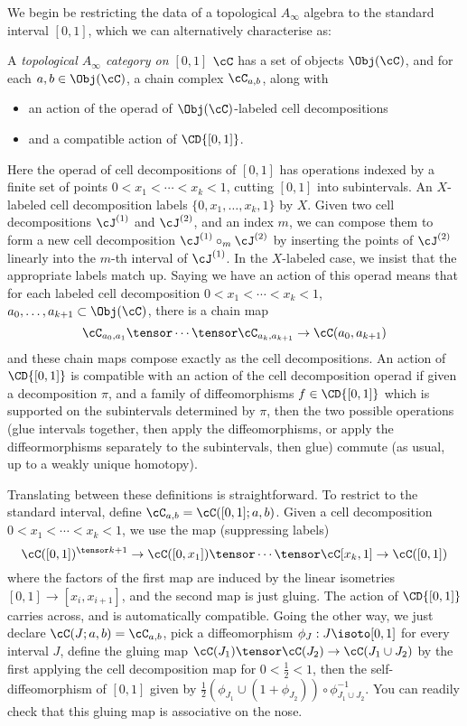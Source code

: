 \documentclass[11pt,leqno]{amsart}
\begin{document}
We begin be restricting the data of a topological $A_\infty$ algebra to the standard interval $[0,1]$, which we can alternatively characterise as:
\begin{defn}
A \emph{topological $A_\infty$ category on $[0,1]$} $\cC$ has a set of objects $\Obj(\cC)$, and for each $a,b \in \Obj(\cC)$, a chain complex $\cC_{a,b}$, along with
\begin{itemize}
\item an action of the operad of $\Obj(\cC)$-labeled cell decompositions
\item and a compatible action of $\CD{[0,1]}$.
\end{itemize}
\end{defn}
Here the operad of cell decompositions of $[0,1]$ has operations indexed by a finite set of points $0 < x_1< \cdots < x_k < 1$, cutting $[0,1]$ into subintervals. An $X$-labeled cell decomposition labels $\{0, x_1, \ldots, x_k, 1\}$ by $X$. Given two cell decompositions $\cJ^{(1)}$ and $\cJ^{(2)}$, and an index $m$, we can compose them to form a new cell decomposition $\cJ^{(1)} \circ_m \cJ^{(2)}$ by inserting the points of $\cJ^{(2)}$ linearly into the $m$-th interval of $\cJ^{(1)}$. In the $X$-labeled case, we insist that the appropriate labels match up. Saying we have an action of this operad means that for each labeled cell decomposition $0 < x_1< \cdots < x_k < 1$, $a_0, \ldots, a_{k+1} \subset \Obj(\cC)$, there is a chain map $$\cC_{a_0,a_1} \tensor \cdots \tensor \cC_{a_k,a_{k+1}} \to \cC(a_0,a_{k+1})$$ and these chain maps compose exactly as the cell decompositions.
An action of $\CD{[0,1]}$ is compatible with an action of the cell decomposition operad if given a decomposition $\pi$, and a family of diffeomorphisms $f \in \CD{[0,1]}$ which is supported on the subintervals determined by $\pi$, then the two possible operations (glue intervals together, then apply the diffeomorphisms, or apply the diffeormorphisms separately to the subintervals, then glue) commute (as usual, up to a weakly unique homotopy).

Translating between these definitions is straightforward. To restrict to the standard interval, define $\cC_{a,b} = \cC([0,1];a,b)$. Given a cell decomposition $0 < x_1< \cdots < x_k < 1$, we use the map (suppressing labels)
$$\cC([0,1])^{\tensor k+1} \to \cC([0,x_1]) \tensor \cdots \tensor \cC[x_k,1] \to \cC([0,1])$$
where the factors of the first map are induced by the linear isometries $[0,1] \to [x_i, x_{i+1}]$, and the second map is just gluing. The action of $\CD{[0,1]}$ carries across, and is automatically compatible. Going the other way, we just declare $\cC(J;a,b) = \cC_{a,b}$, pick a diffeomorphism $\phi_J : J \isoto [0,1]$ for every interval $J$, define the gluing map $\cC(J_1) \tensor \cC(J_2) \to \cC(J_1 \cup J_2)$ by the first applying the cell decomposition map for $0 < \frac{1}{2} < 1$, then the self-diffeomorphism of $[0,1]$ given by $\frac{1}{2} (\phi_{J_1} \cup (1+ \phi_{J_2})) \circ \phi_{J_1 \cup J_2}^{-1}$. You can readily check that this gluing map is associative on the nose. 
\end{document}
